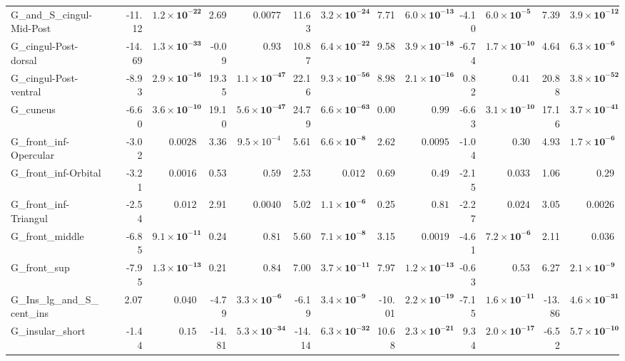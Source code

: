 {\begin{longtable}{llrrrrrrrrrrrr}
G\_and\_S\_cingul-Mid-Post &  & -11.12 & $\mathbf{1.2{\times}10^{-22}}$ & 2.69 & $0.0077$ & 11.63 & $\mathbf{3.2{\times}10^{-24}}$ & 7.71 & $\mathbf{6.0{\times}10^{-13}}$ & -4.10 & $\mathbf{6.0{\times}10^{-5}}$ & 7.39 & $\mathbf{3.9{\times}10^{-12}}$ \\
G\_cingul-Post-dorsal &  & -14.69 & $\mathbf{1.3{\times}10^{-33}}$ & -0.09 & $0.93$ & 10.87 & $\mathbf{6.4{\times}10^{-22}}$ & 9.58 & $\mathbf{3.9{\times}10^{-18}}$ & -6.74 & $\mathbf{1.7{\times}10^{-10}}$ & 4.64 & $\mathbf{6.3{\times}10^{-6}}$ \\
G\_cingul-Post-ventral &  & -8.93 & $\mathbf{2.9{\times}10^{-16}}$ & 19.35 & $\mathbf{1.1{\times}10^{-47}}$ & 22.16 & $\mathbf{9.3{\times}10^{-56}}$ & 8.98 & $\mathbf{2.1{\times}10^{-16}}$ & 0.82 & $0.41$ & 20.88 & $\mathbf{3.8{\times}10^{-52}}$ \\
G\_cuneus &  & -6.60 & $\mathbf{3.6{\times}10^{-10}}$ & 19.10 & $\mathbf{5.6{\times}10^{-47}}$ & 24.79 & $\mathbf{6.6{\times}10^{-63}}$ & 0.00 & $0.99$ & -6.63 & $\mathbf{3.1{\times}10^{-10}}$ & 17.16 & $\mathbf{3.7{\times}10^{-41}}$ \\
G\_front\_inf-Opercular &  & -3.02 & $0.0028$ & 3.36 & $9.5{\times}10^{-4}$ & 5.61 & $\mathbf{6.6{\times}10^{-8}}$ & 2.62 & $0.0095$ & -1.04 & $0.30$ & 4.93 & $\mathbf{1.7{\times}10^{-6}}$ \\
G\_front\_inf-Orbital &  & -3.21 & $0.0016$ & 0.53 & $0.59$ & 2.53 & $0.012$ & 0.69 & $0.49$ & -2.15 & $0.033$ & 1.06 & $0.29$ \\
G\_front\_inf-Triangul &  & -2.54 & $0.012$ & 2.91 & $0.0040$ & 5.02 & $\mathbf{1.1{\times}10^{-6}}$ & 0.25 & $0.81$ & -2.27 & $0.024$ & 3.05 & $0.0026$ \\
G\_front\_middle &  & -6.85 & $\mathbf{9.1{\times}10^{-11}}$ & 0.24 & $0.81$ & 5.60 & $\mathbf{7.1{\times}10^{-8}}$ & 3.15 & $0.0019$ & -4.61 & $\mathbf{7.2{\times}10^{-6}}$ & 2.11 & $0.036$ \\
G\_front\_sup &  & -7.95 & $\mathbf{1.3{\times}10^{-13}}$ & 0.21 & $0.84$ & 7.00 & $\mathbf{3.7{\times}10^{-11}}$ & 7.97 & $\mathbf{1.2{\times}10^{-13}}$ & -0.63 & $0.53$ & 6.27 & $\mathbf{2.1{\times}10^{-9}}$ \\
G\_Ins\_lg\_and\_S\_cent\_ins &  & 2.07 & $0.040$ & -4.79 & $\mathbf{3.3{\times}10^{-6}}$ & -6.19 & $\mathbf{3.4{\times}10^{-9}}$ & -10.01 & $\mathbf{2.2{\times}10^{-19}}$ & -7.15 & $\mathbf{1.6{\times}10^{-11}}$ & -13.86 & $\mathbf{4.6{\times}10^{-31}}$ \\
G\_insular\_short &  & -1.44 & $0.15$ & -14.81 & $\mathbf{5.3{\times}10^{-34}}$ & -14.14 & $\mathbf{6.3{\times}10^{-32}}$ & 10.68 & $\mathbf{2.3{\times}10^{-21}}$ & 9.34 & $\mathbf{2.0{\times}10^{-17}}$ & -6.52 & $\mathbf{5.7{\times}10^{-10}}$ \\

\end{longtable}}
